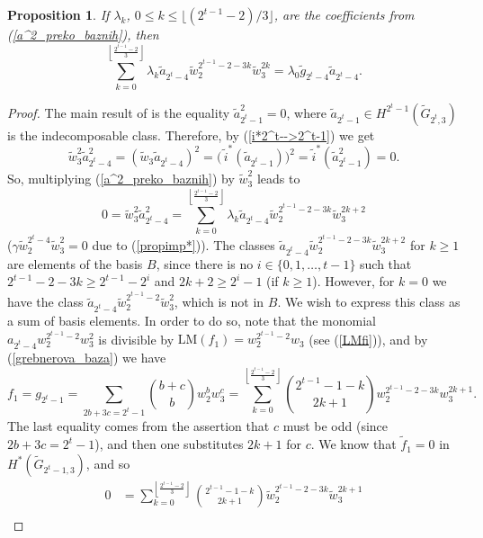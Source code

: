 \documentclass{amsart}
\newtheorem{proposition}[theorem]{Proposition}
\theoremstyle{definition}
\theoremstyle{remark}
\numberwithin{equation}{section}
\begin{document}
\begin{proposition}\label{lambde}
If $\lambda_k$, $0\le k\le\lfloor(2^{t-1}-2)/3\rfloor$, are the coefficients from (\ref{a^2_preko_baznih}), then
\[\sum_{k=0}^{\left\lfloor \frac{2^{t-1}-2}{3} \right\rfloor} \lambda_k \widetilde a_{2^t-4} \widetilde w_2^{2^{t-1}-2-3k}\widetilde w_3^{2k}=\lambda_0\widetilde g_{2^t-4}\widetilde a_{2^t-4}.\]
\end{proposition}
\begin{proof}
The main result of \cite{CP} is the equality $\widetilde a_{2^t-1}^2=0$, where $\widetilde a_{2^t-1}\in H^{2^t-1}(\widetilde G_{2^t,3})$ is the indecomposable class. Therefore, by (\ref{i*2^t-->2^t-1}) we get
\[\widetilde w_3^2\widetilde a_{2^t-4}^2=(\widetilde w_3\widetilde a_{2^t-4})^2=\big(\,\widetilde i^*(\widetilde a_{2^t-1})\big)^2=\widetilde i^*(\widetilde a_{2^t-1}^2)=0.\]
So, multiplying (\ref{a^2_preko_baznih}) by $\widetilde w_3^2$ leads to 
  \begin{equation}\label{w3^2a^2=0}
        0 = \widetilde w_3^2 \widetilde a_{2^t-4}^2 = \sum_{k=0}^{\left\lfloor \frac{2^{t-1}-2}{3} \right\rfloor} \lambda_k \widetilde a_{2^t-4} \widetilde w_2^{2^{t-1}-2-3k}\widetilde w_3^{2k+2}
    \end{equation}
($\gamma\widetilde w_2^{2^t-4}\widetilde w_3^2=0$ due to (\ref{propimp*})). The classes $\widetilde a_{2^t-4} \widetilde w_2^{2^{t-1}-2-3k}\widetilde w_3^{2k+2}$ for $k\ge1$ are elements of the basis $B$, since there is no $i\in\{0,1,\ldots,t-1\}$ such that $2^{t-1}-2-3k\ge2^{t-1}-2^i$ and $2k+2\ge2^i-1$ (if $k\ge1$). However, for $k=0$ we have the class $\widetilde a_{2^t-4} \widetilde w_2^{2^{t-1}-2}\widetilde w_3^2$, which is not in $B$. We wish to express this class as a sum of basis elements. In order to do so, note that the monomial $a_{2^t-4}w_2^{2^{t-1}-2}w_3^2$ is divisible by $\mathrm{LM}(f_1)=w_2^{2^{t-1}-2}w_3$ (see (\ref{LMfi})), and by (\ref{grebnerova_baza}) we have
\begin{equation}\label{f_1} 
   f_1 =g_{2^t-1} = \sum_{2b+3c=2^t-1} \binom{b+c}{b}w_2^b w_3^c= \sum_{k = 0}^{\left\lfloor \frac{2^{t-1}-2}{3} \right\rfloor} \binom{2^{t-1}-1-k}{2k+1} w_2^{2^{t-1}-2-3k}w_3^{2k+1}. 
\end{equation}
The last equality comes from the assertion that $c$ must be odd (since $2b+3c=2^t-1$), and then one substitutes $2k+1$ for $c$. We know that $\widetilde f_1=0$ in $H^*(\widetilde G_{2^t-1,3})$, and so
\begin{align*}
0&=\sum_{k = 0}^{\left\lfloor \frac{2^{t-1}-2}{3} \right\rfloor} \binom{2^{t-1}-1-k}{2k+1}\widetilde w_2^{2^{t-1}-2-3k}\widetilde w_3^{2k+1}\\

\end{align*}
\end{proof}
\end{document}
